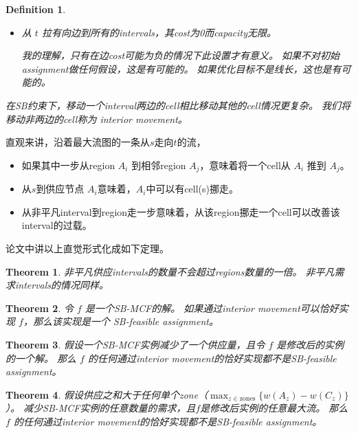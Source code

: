 \documentclass[UTF8,a4paper]{ctexart}
\newtheorem{theorem}{Theorem}
\newtheorem{definition}{Definition}
\begin{document}
\begin{definition}
\begin{description}
\begin{itemize}
            类似地处理需求intervals。
            \begin{noteblock}
                从论文的描述来看，可以从非平凡interval到非平凡interval拉边。
                但我没想到这样做的好处。
            \end{noteblock}
        \item 从 $t$ 拉有向边到所有的intervals，其cost为0而capacity无限。
            \begin{noteblock}
                我的理解，只有在边cost可能为负的情况下此设置才有意义。
                如果不对初始assignment做任何假设，这是有可能的。
                如果优化目标不是线长，这也是有可能的。
            \end{noteblock}
        \end{itemize}
    \item[interior movement]
        在SB约束下，移动一个interval两边的cell相比移动其他的cell情况更复杂。
        我们将移动非两边的cell称为 interior movement。
    \end{description}
\end{definition}

直观来讲，沿着最大流图的一条从$s$走向$t$的流，
\begin{itemize}
\item 如果其中一步从region $A_i$ 到相邻region $A_j$，意味着将一个cell从 $A_i$ 推到 $A_j$。
\item 从$s$到供应节点 $A_i$意味着，$A_i$中可以有cell(s)挪走。
\item 从非平凡interval到region走一步意味着，从该region挪走一个cell可以改善该interval的过载。
\end{itemize}
论文中讲以上直觉形式化成如下定理。

\begin{theorem}
    非平凡供应intervals的数量不会超过regions数量的一倍。
    非平凡需求intervals的情况同样。
\end{theorem}

\begin{theorem}
    令 $f$ 是一个SB-MCF的解。
    如果通过interior movement可以恰好实现 $f$，那么该实现是一个 SB-feasible assignment。
\end{theorem}

\begin{theorem}
    假设一个SB-MCF实例减少了一个供应量，且令 $f$ 是修改后的实例的一个解。
    那么 $f$ 的任何通过interior movement的恰好实现都不是SB-feasible assignment。
\end{theorem}

\begin{theorem}
    假设供应之和大于任何单个zone（$\max_{z\in\text{zones}}\{w(A_z)-w(C_z)\}$）。
    减少SB-MCF实例的任意数量的需求，且$f$是修改后实例的任意最大流。
    那么 $f$ 的任何通过interior movement的恰好实现都不是SB-feasible assignment。
\end{theorem}
\end{document}

